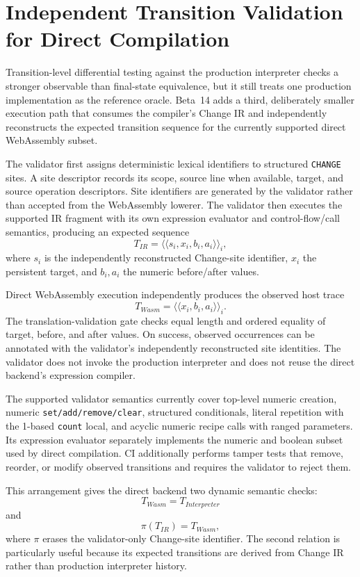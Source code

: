 \section{Independent Transition Validation for Direct Compilation}
\label{sec:direct-trace-validation}

Transition-level differential testing against the production interpreter checks a stronger observable than final-state equivalence, but it still treats one production implementation as the reference oracle. Beta~14 adds a third, deliberately smaller execution path that consumes the compiler's Change IR and independently reconstructs the expected transition sequence for the currently supported direct WebAssembly subset.

The validator first assigns deterministic lexical identifiers to structured \texttt{CHANGE} sites. A site descriptor records its scope, source line when available, target, and source operation descriptors. Site identifiers are generated by the validator rather than accepted from the WebAssembly lowerer. The validator then executes the supported IR fragment with its own expression evaluator and control-flow/call semantics, producing an expected sequence
\[
T_{IR}=\langle\langle s_i,x_i,b_i,a_i\rangle\rangle_i,
\]
where $s_i$ is the independently reconstructed Change-site identifier, $x_i$ the persistent target, and $b_i,a_i$ the numeric before/after values.

Direct WebAssembly execution independently produces the observed host trace
\[
T_{Wasm}=\langle\langle x_i,b_i,a_i\rangle\rangle_i.
\]
The translation-validation gate checks equal length and ordered equality of target, before, and after values. On success, observed occurrences can be annotated with the validator's independently reconstructed site identities. The validator does not invoke the production interpreter and does not reuse the direct backend's expression compiler.

The supported validator semantics currently cover top-level numeric creation, numeric \texttt{set/add/remove/clear}, structured conditionals, literal repetition with the 1-based \texttt{count} local, and acyclic numeric recipe calls with ranged parameters. Its expression evaluator separately implements the numeric and boolean subset used by direct compilation. CI additionally performs tamper tests that remove, reorder, or modify observed transitions and requires the validator to reject them.

This arrangement gives the direct backend two dynamic semantic checks:
\[
T_{Wasm}=T_{Interpreter}
\]
and
\[
\pi(T_{IR})=T_{Wasm},
\]
where $\pi$ erases the validator-only Change-site identifier. The second relation is particularly useful because its expected transitions are derived from Change IR rather than production interpreter history.

